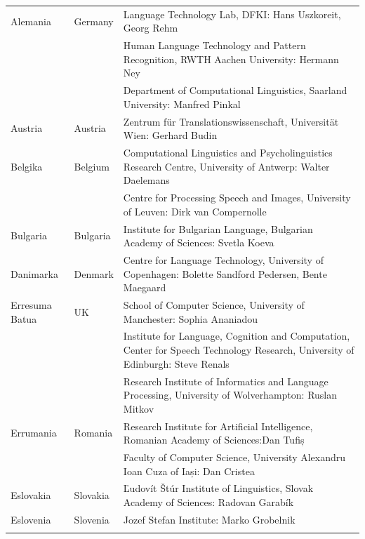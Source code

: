 \begin{longtable}{@{}llp{113mm}@{}}
  Alemania & \textcolor{grey1}{Germany} & Language Technology Lab, DFKI: Hans Uszkoreit, Georg Rehm\\ \addlinespace
  & & Human Language Technology and Pattern Recognition, RWTH Aachen University: Hermann Ney \\ \addlinespace
  & & Department of Computational Linguistics, Saarland University: Manfred Pinkal\\ \addlinespace 
  Austria & \textcolor{grey1}{Austria} & Zentrum für Translationswissenschaft, Universität Wien: Gerhard Budin\\ \addlinespace 
  Belgika & \textcolor{grey1}{Belgium} & Computational Linguistics and Psycholinguistics Research Centre, University of Antwerp: Walter Daelemans\\ \addlinespace
  & & Centre for Processing Speech and Images, University of Leuven: Dirk van Compernolle \\ \addlinespace
  Bulgaria & \textcolor{grey1}{Bulgaria} & Institute for Bulgarian Language, Bulgarian Academy of Sciences: Svetla Koeva \\ \addlinespace
  Danimarka &  \textcolor{grey1}{Denmark} & Centre for Language Technology, University of Copenhagen: \newline Bolette Sandford Pedersen, Bente Maegaard\\ \addlinespace
Erresuma Batua & \textcolor{grey1}{UK} & 
  School of Computer Science, University of Manchester: Sophia Ananiadou \\ \addlinespace 
  & & Institute for Language, Cognition and Computation, Center for Speech Technology Research, University of Edinburgh: Steve Renals \\ \addlinespace 
  & & Research Institute of Informatics and Language Processing, University of Wolverhampton: Ruslan Mitkov \\ \addlinespace 
  Errumania & \textcolor{grey1}{Romania} & Research Institute for Artificial Intelligence, Romanian Academy of Sciences:\newline Dan Tufiș \\ \addlinespace
  & & Faculty of Computer Science, University Alexandru Ioan Cuza of Iași: Dan Cristea \\ \addlinespace
  Eslovakia & \textcolor{grey1}{Slovakia} & Ľudovít Štúr Institute of Linguistics, Slovak Academy of Sciences: Radovan Garabík \\ \addlinespace 
  Eslovenia & \textcolor{grey1}{Slovenia} & Jozef Stefan Institute: Marko Grobelnik \\ \addlinespace 

\end{longtable}
